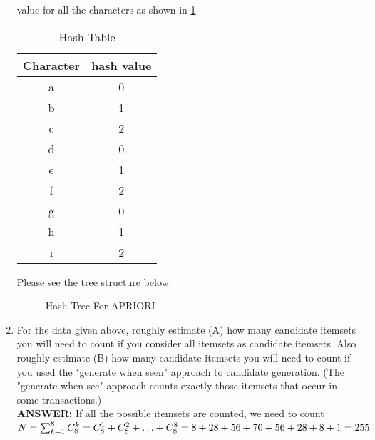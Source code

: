 \documentclass{article}
\begin{document}
\begin{enumerate}
value for all the characters as shown in \ref{tbl:hash_value}
\begin{table}[ht]
  \begin{center}
    \begin{tabular}{|c|c|}
      \toprule Character & hash value \\
      \midrule a & 0 \\
      \midrule b & 1 \\ 
      \midrule c & 2 \\ 
      \midrule d & 0 \\
      \midrule e & 1 \\ 
      \midrule f & 2 \\ 
      \midrule g & 0 \\
      \midrule h & 1 \\ 
      \midrule i & 2 \\ 
      \bottomrule
    \end{tabular}
    \label{tbl:hash_value}
    \caption{Hash Table}
  \end{center}
\end{table}
Please see the tree structure below: \\
\begin{figure}[htb]
  \begin{center}
    \caption{Hash Tree For APRIORI}
    \label{tree:hash}
  \end{center}
\end{figure}

\item For the data given above, roughly estimate (A) how many
  candidate itemsets you will need to count if you consider all
  itemsets as candidate itemsets. Also roughly estimate (B) how many
  candidate itemsets you will need to count if you used the "generate
  when seen" approach to candidate generation. (The "generate when
  see" approach counts exactly those itemsets that occur in some
  transactions.) \\
\textbf{ANSWER:} If all the possible itemsets are counted, we need to
count \\
$N = \sum_{k=1}^8C_8^k = C_8^1 + C_8^2 + \ldots + C_8^8 \\
= 8 + 28 + 56 + 70 + 56 + 28 + 8 + 1\\
= 255$ \\


\end{enumerate}
\end{document}
